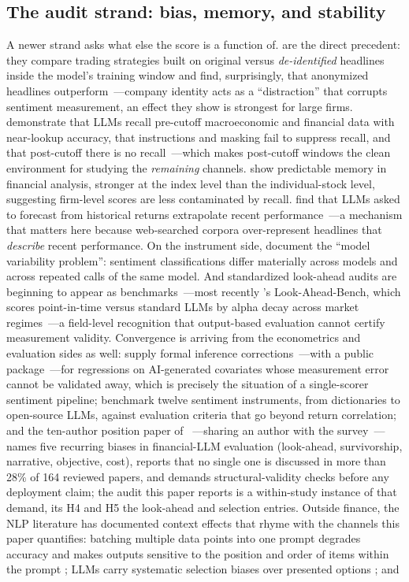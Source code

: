 \subsection{The audit strand: bias, memory, and stability}

A newer strand asks what else the score is a function of. \citet{glasserman2023} are the direct precedent: they compare trading strategies built on original versus \emph{de-identified} headlines inside the model's training window and find, surprisingly, that anonymized headlines outperform~---company identity acts as a ``distraction'' that corrupts sentiment measurement, an effect they show is strongest for large firms. \citet{lopezlira2025} demonstrate that LLMs recall pre-cutoff macroeconomic and financial data with near-lookup accuracy, that instructions and masking fail to suppress recall, and that post-cutoff there is no recall~---which makes post-cutoff windows the clean environment for studying the \emph{remaining} channels. \citet{didisheim2025} show predictable memory in financial analysis, stronger at the index level than the individual-stock level, suggesting firm-level scores are less contaminated by recall. \citet{chen2025} find that LLMs asked to forecast from historical returns extrapolate recent performance~---a mechanism that matters here because web-searched corpora over-represent headlines that \emph{describe} recent performance. On the instrument side, \citet{herrera2025} document the ``model variability problem'': sentiment classifications differ materially across models and across repeated calls of the same model. And standardized look-ahead audits are beginning to appear as benchmarks~---most recently \citet{benhenda2026}'s Look-Ahead-Bench, which scores point-in-time versus standard LLMs by alpha decay across market regimes~---a field-level recognition that output-based evaluation cannot certify measurement validity. Convergence is arriving from the econometrics and evaluation sides as well: \citet{christensen2026} supply formal inference corrections~---with a public package~---for regressions on AI-generated covariates whose measurement error cannot be validated away, which is precisely the situation of a single-scorer sentiment pipeline; \citet{bisharat2026} benchmark twelve sentiment instruments, from dictionaries to open-source LLMs, against evaluation criteria that go beyond return correlation; and the ten-author position paper of \citet{kong2026}~---sharing an author with the \citet{nie2024survey} survey~---names five recurring biases in financial-LLM evaluation (look-ahead, survivorship, narrative, objective, cost), reports that no single one is discussed in more than 28\% of 164 reviewed papers, and demands structural-validity checks before any deployment claim; the audit this paper reports is a within-study instance of that demand, its H4 and H5 the look-ahead and selection entries. Outside finance, the NLP literature has documented context effects that rhyme with the channels this paper quantifies: batching multiple data points into one prompt degrades accuracy and makes outputs sensitive to the position and order of items within the prompt \citep{lin2024batch, liu2024lost}; LLMs carry systematic selection biases over presented options \citep{zheng2024}; and 
